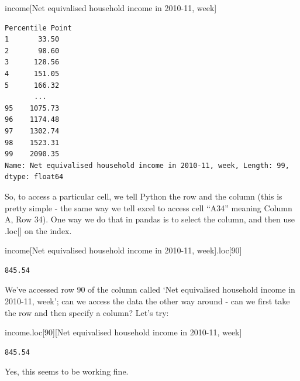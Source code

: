 \documentclass[
  letterpaper,
  DIV=11,
  numbers=noendperiod]{scrreprt}
\newenvironment{Shaded}{\begin{snugshade}}{\end{snugshade}}
\newcommand{\DecValTok}[1]{\textcolor[rgb]{0.68,0.00,0.00}{#1}}
\newcommand{\NormalTok}[1]{\textcolor[rgb]{0.00,0.23,0.31}{#1}}
\newcommand{\StringTok}[1]{\textcolor[rgb]{0.13,0.47,0.30}{#1}}
\begin{document}
\begin{Shaded}
\begin{Highlighting}[]
\NormalTok{income[}\StringTok{\textquotesingle{}Net equivalised household income in 2010{-}11, week\textquotesingle{}}\NormalTok{]}
\end{Highlighting}
\end{Shaded}

\begin{verbatim}
Percentile Point
1       33.50
2       98.60
3      128.56
4      151.05
5      166.32
       ...   
95    1075.73
96    1174.48
97    1302.74
98    1523.31
99    2090.35
Name: Net equivalised household income in 2010-11, week, Length: 99, dtype: float64
\end{verbatim}

So, to access a particular cell, we tell Python the row and the column
(this is pretty simple - the same way we tell excel to access cell
``A34'' meaning Column A, Row 34). One way we do that in pandas is to
select the column, and then use .loc{[}{]} on the index.

\begin{Shaded}
\begin{Highlighting}[]
\NormalTok{income[}\StringTok{\textquotesingle{}Net equivalised household income in 2010{-}11, week\textquotesingle{}}\NormalTok{].loc[}\DecValTok{90}\NormalTok{]}
\end{Highlighting}
\end{Shaded}

\begin{verbatim}
845.54
\end{verbatim}

We've accessed row 90 of the column called `Net equivalised household
income in 2010-11, week'; can we access the data the other way around -
can we first take the row and then specify a column? Let's try:

\begin{Shaded}
\begin{Highlighting}[]
\NormalTok{income.loc[}\DecValTok{90}\NormalTok{][}\StringTok{\textquotesingle{}Net equivalised household income in 2010{-}11, week\textquotesingle{}}\NormalTok{]}
\end{Highlighting}
\end{Shaded}

\begin{verbatim}
845.54
\end{verbatim}

Yes, this seems to be working fine.
\end{document}
